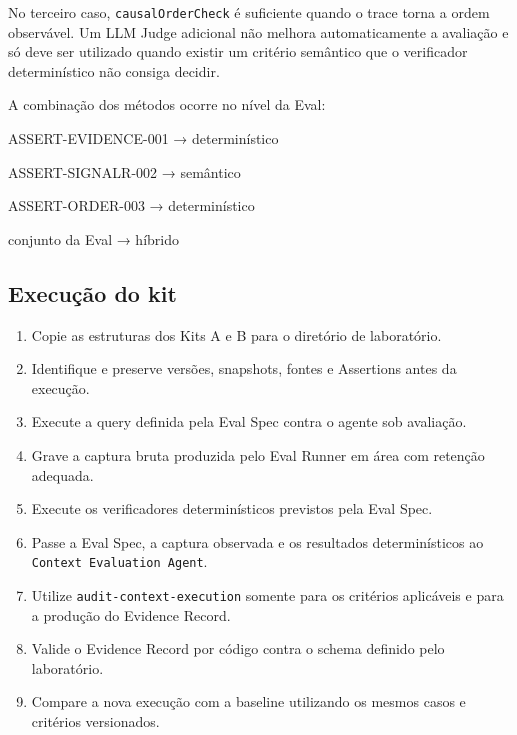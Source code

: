 \documentclass[
  10pt,
  a4paper,
  oneside]{book}
\newenvironment{Shaded}{}{}
\newcommand{\NormalTok}[1]{#1}
\providecommand{\tightlist}{%
  \setlength{\itemsep}{0pt}\setlength{\parskip}{0pt}}
\renewenvironment{Shaded}{\begin{snugshade}}{\end{snugshade}}%
\begin{document}
No terceiro caso, \texttt{causalOrderCheck} é suficiente quando o trace
torna a ordem observável. Um LLM Judge adicional não melhora
automaticamente a avaliação e só deve ser utilizado quando existir um
critério semântico que o verificador determinístico não consiga decidir.

A combinação dos métodos ocorre no nível da Eval:

\begin{Shaded}
\begin{Highlighting}[]
\NormalTok{ASSERT{-}EVIDENCE{-}001}
\NormalTok{→ determinístico}

\NormalTok{ASSERT{-}SIGNALR{-}002}
\NormalTok{→ semântico}

\NormalTok{ASSERT{-}ORDER{-}003}
\NormalTok{→ determinístico}

\NormalTok{conjunto da Eval}
\NormalTok{→ híbrido}
\end{Highlighting}
\end{Shaded}

\hypertarget{execuuxe7uxe3o-do-kit}{%
\subsection{Execução do kit}\label{execuuxe7uxe3o-do-kit}}

\begin{enumerate}
\def\labelenumi{\arabic{enumi}.}
\tightlist
\item
  Copie as estruturas dos Kits A e B para o diretório de laboratório.
\item
  Identifique e preserve versões, snapshots, fontes e Assertions antes
  da execução.
\item
  Execute a query definida pela Eval Spec contra o agente sob avaliação.
\item
  Grave a captura bruta produzida pelo Eval Runner em área com retenção
  adequada.
\item
  Execute os verificadores determinísticos previstos pela Eval Spec.
\item
  Passe a Eval Spec, a captura observada e os resultados determinísticos
  ao \texttt{Context\ Evaluation\ Agent}.
\item
  Utilize \texttt{audit-context-execution} somente para os critérios
  aplicáveis e para a produção do Evidence Record.
\item
  Valide o Evidence Record por código contra o schema definido pelo
  laboratório.
\item
  Compare a nova execução com a baseline utilizando os mesmos casos e
  critérios versionados.
\end{enumerate}
\end{document}
